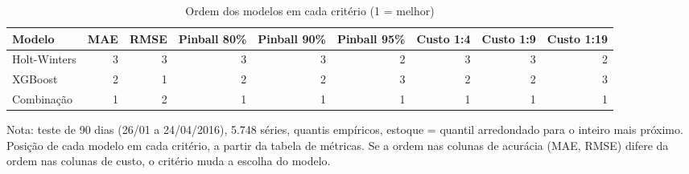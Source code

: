 \begin{table}[htbp]
\centering
\small
\caption{Ordem dos modelos em cada critério (1 = melhor)}
\label{tab:comp_ordem}
\begin{tabular}{lrrrrrrrr}
\toprule
Modelo & MAE & RMSE & Pinball 80\% & Pinball 90\% & Pinball 95\% & Custo 1:4 & Custo 1:9 & Custo 1:19 \\
\midrule
Holt-Winters & 3 & 3 & 3 & 3 & 2 & 3 & 3 & 2 \\
XGBoost & 2 & 1 & 2 & 2 & 3 & 2 & 2 & 3 \\
Combinação & 1 & 2 & 1 & 1 & 1 & 1 & 1 & 1 \\
\bottomrule
\end{tabular}
\par\smallskip
{\footnotesize Nota: teste de 90 dias (26/01 a 24/04/2016), 5.748 séries, quantis empíricos, estoque = quantil arredondado para o inteiro mais próximo. Posição de cada modelo em cada critério, a partir da tabela de métricas. Se a ordem nas colunas de acurácia (MAE, RMSE) difere da ordem nas colunas de custo, o critério muda a escolha do modelo.}
\end{table}
